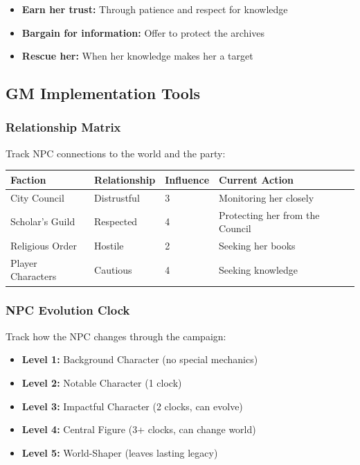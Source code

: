 \begin{itemize}
  \item \textbf{Earn her trust:} Through patience and respect for knowledge
  \item \textbf{Bargain for information:} Offer to protect the archives
  \item \textbf{Rescue her:} When her knowledge makes her a target
\end{itemize}

\subsection{GM Implementation Tools}

\subsubsection{Relationship Matrix}

Track NPC connections to the world and the party:

\begin{center}
\begin{tabular}{|p{}|p{}|p{}|p{}|}
\hline
\textbf{Faction} & \textbf{Relationship} & \textbf{Influence} & \textbf{Current Action} \\ \hline
City Council & Distrustful & 3 & Monitoring her closely \\ \hline
Scholar's Guild & Respected & 4 & Protecting her from the Council \\ \hline
Religious Order & Hostile & 2 & Seeking her books \\ \hline
Player Characters & Cautious & 4 & Seeking knowledge \\ \hline
\end{tabular}
\end{center}

\subsubsection{NPC Evolution Clock}

Track how the NPC changes through the campaign:

\begin{itemize}
  \item \textbf{Level 1:} Background Character (no special mechanics)
  \item \textbf{Level 2:} Notable Character (1 clock)
  \item \textbf{Level 3:} Impactful Character (2 clocks, can evolve)
  \item \textbf{Level 4:} Central Figure (3+ clocks, can change world)
  \item \textbf{Level 5:} World-Shaper (leaves lasting legacy)
\end{itemize}

